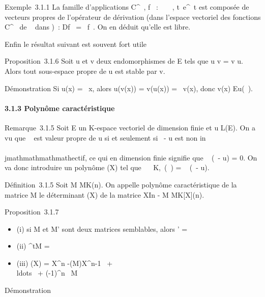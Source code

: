 Exemple~3.1.1 La famille d'applications C^\infty~, f\lambda~ : ~
\rightarrow~ , t\mapsto~e^\lambda~t est composée de
vecteurs propres de l'opérateur de dérivation (dans l'espace vectoriel
des fonctions C^\infty~ de ~ dans )~: Df\lambda~ =
\lambda~f\lambda~. On en déduit qu'elle est libre.

Enfin le résultat suivant est souvent fort utile

Proposition~3.1.6 Soit u et v deux endomorphismes de E tels que u \cdot v =
v \cdot u. Alors tout sous-espace propre de u est stable par v.

Démonstration Si u(x) = \lambda~x, alors u(v(x)) = v(u(x)) = \lambda~v(x), donc v(x) \in
Eu(\lambda~).

\paragraph{3.1.3 Polynôme caractéristique}

Remarque~3.1.5 Soit E un K-espace vectoriel de dimension finie et u \in
L(E). On a vu que \lambda~ est valeur propre de u si et seulement si
\lambda~\mathrmIdE - u est non in\\\\jmathmathmathmathectif, ce qui en
dimension finie signifie que
~
(\lambda~\mathrmIdE - u) = 0. On va donc
introduire un polynôme \chiu(X) tel que
\forall~\lambda~ \in K,\chiu~(\lambda~)
= ~
(\lambda~\mathrmIdE - u).

Définition~3.1.5 Soit M \in MK(n). On appelle polynôme
caractéristique de la matrice M le déterminant \chiM(X) de la
matrice XIn - M \in MK{[}X{]}(n).

Proposition~3.1.7

\begin{itemize}
\itemsep1pt\parskip0pt
\item
  (i) si M et M' sont deux matrices semblables, alors \chiM' =
  \chiM
\item
  (ii) \chi^tM = \chiM
\item
  (iii) \chiM(X) = X^n
  -(M)X^n-1~
  + \\ldots~ +
  (-1)^n\
   M
\end{itemize}

Démonstration

